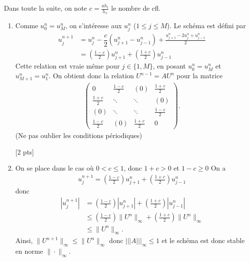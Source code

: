 \documentclass[12pt]{article}
\begin{document}
\begin{cor}
\begin{enumerate}
    [2 pts]


  \end{enumerate}
  
\end{cor}


\begin{cor}
  $\quad$
  \\
  Dans toute la suite, on note
  $c = \frac{a h_t}{h_x}$ le nombre de cfl.
  \begin{enumerate}
  \item
    Comme $u_0^n = u_M^n$, on s'int\'eresse aux $u_j^n$ ($1 \leq j \leq M$).
    Le sch\'ema est d\'efini par
    \begin{align*}
      u_{j}^{n+1}
      &= u_j^n - \dfrac{c}{2} ( u_{j+1}^n - u_{j-1}^n ) + \frac{u_{j+1}^n - 2 u_j^n + u_{j-1}^n}{2}
      \\
      &= \left( \frac{1-c}2 \right) u_{j+1}^n + \left( \frac{1+c}2 \right) u_{j-1}^n
    \end{align*}
    Cette relation est vraie m\^eme pour $j \in \{1,M\}$, en posant
    $u_0^n = u_M^n$ et $u_{M+1}^n = u_1^n$.
    On obtient donc la relation $U^{n-1} = A U^n$ pour la matrice
    \begin{align*}
      \begin{pmatrix}
        0 & \frac{1-c}2 & (0) & \frac{1+c}2
        \\
        \frac{1+c}2 & \ddots & \ddots &  (0)
        \\
        (0)& \ddots & \ddots & \frac{1-c}2
        \\
        \frac{1-c}2 & (0) & \frac{1+c}2 & 0
      \end{pmatrix} .
    \end{align*}
    (Ne pas oublier les conditions p\'eriodiques)

    [2 pts]

  \item
    On se place dans le cas o\`u $0 < c \leq 1$, donc $1+c > 0$ et $1-c \geq 0$
    On a
    \begin{align*}
      u_{j}^{n+1} = \left( \frac{1-c}2 \right) u_{j+1}^n + \left( \frac{1+c}2 \right) u_{j-1}^n
    \end{align*}
    donc
    \begin{align*}
      | u_{j}^{n+1} |
      &= \left( \frac{1-c}2 \right) | u_{j+1}^n | + \left( \frac{1+c}2 \right) |u_{j-1}^n|
      \\
      &\leq \left( \frac{1-c}2 \right) \| U^n \|_{\infty}
        + \left( \frac{1+c}2 \right) \| U^n \|_{\infty}
      \\
      &\leq \| U^n \|_{\infty} .
    \end{align*}
    Ainsi, $\| U^{n+1} \|_{\infty} \leq \| U^n \|_{\infty}$ donc $||| A |||_{\infty} \leq 1$
    et le sch\'ema est donc stable en norme $\| \cdot \|_{\infty}$.
    

\end{enumerate}
\end{cor}
\end{document}
